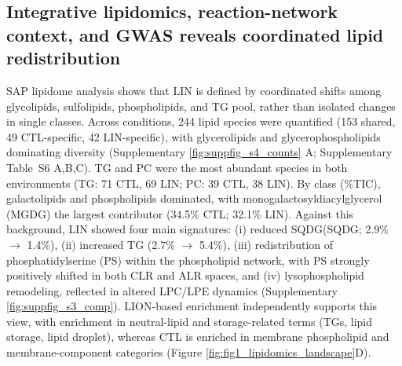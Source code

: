 \documentclass[9pt,twocolumn,twoside]{rilabRxiv}
\begin{document}
\subsection*{Integrative lipidomics, reaction-network context, and GWAS reveals coordinated lipid redistribution}

SAP lipidome analysis shows that LIN is defined by coordinated shifts among glycolipids, sulfolipids, phospholipids, and TG pool, rather than isolated changes in single classes. Across conditions, 244 lipid species were quantified (153 shared, 49 CTL-specific, 42 LIN-specific), with glycerolipids and glycerophospholipids dominating diversity (Supplementary \ref{fig:suppfig_s4_counts} A; Supplementary Table~S6 A,B,C). TG and PC were the most abundant species in both environments (TG: 71 CTL, 69 LIN; PC: 39 CTL, 38 LIN). By class (\%TIC), galactolipids and phospholipids dominated, with monogalactosyldiacylglycerol (MGDG) the largest contributor (34.5\% CTL; 32.1\% LIN). Against this background, LIN showed four main signatures: (i) reduced SQDG(SQDG; 2.9\% $\rightarrow$ 1.4\%), (ii) increased TG (2.7\% $\rightarrow$ 5.4\%), (iii) redistribution of phosphatidylserine (PS) within the phospholipid network, with PS strongly positively shifted in both CLR and ALR spaces, and (iv) lysophospholipid remodeling, reflected in altered LPC/LPE dynamics (Supplementary \ref{fig:suppfig_s3_comp}). LION-based enrichment independently supports this view, with enrichment in neutral-lipid and storage-related terms (TGs, lipid storage, lipid droplet), whereas CTL is enriched in membrane phospholipid and membrane-component categories (Figure \ref{fig:fig1_lipidomics_landscape}D).
\end{document}
